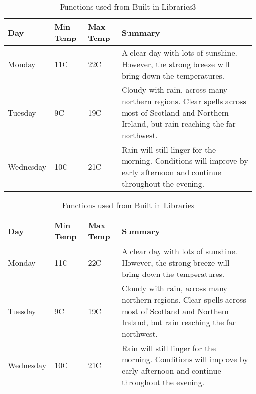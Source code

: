\begin{table}[ht]
\centering
    \begin{tabular}{ | l | l | l | p{5cm} |}
    \hline
    Day & Min Temp & Max Temp & Summary \\ \hline
    Monday & 11C & 22C & A clear day with lots of sunshine.  
    However, the strong breeze will bring down the temperatures. \\ \hline
    Tuesday & 9C & 19C & Cloudy with rain, across many northern regions. Clear spells 
    across most of Scotland and Northern Ireland, 
    but rain reaching the far northwest. \\ \hline
    Wednesday & 10C & 21C & Rain will still linger for the morning. 
    Conditions will improve by early afternoon and continue 
    throughout the evening. \\
    \hline
    \end{tabular}
\caption{Functions used from Built in Libraries3}
\label{tab:function3}
\end{table}

\begin{table}[ht]
\centering
    \begin{tabular}{ | l | l | l | p{5cm} |}
    \hline
    Day & Min Temp & Max Temp & Summary \\ \hline
    Monday & 11C & 22C & A clear day with lots of sunshine.  
    However, the strong breeze will bring down the temperatures. \\ \hline
    Tuesday & 9C & 19C & Cloudy with rain, across many northern regions. Clear spells 
    across most of Scotland and Northern Ireland, 
    but rain reaching the far northwest. \\ \hline
    Wednesday & 10C & 21C & Rain will still linger for the morning. 
    Conditions will improve by early afternoon and continue 
    throughout the evening. \\
    \hline
    \end{tabular}
\caption{Functions used from Built in Libraries}
\label{tab:structure}
\end{table}

